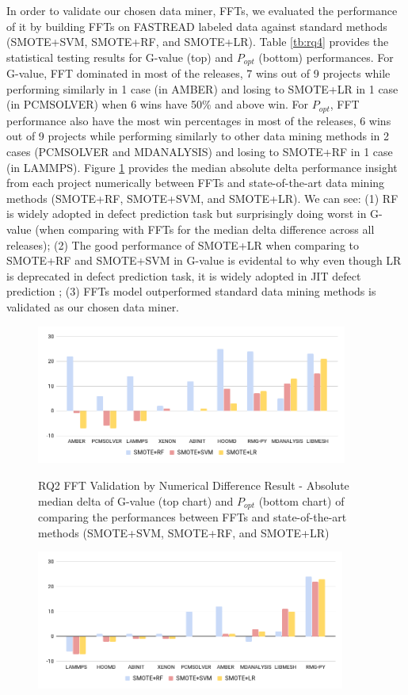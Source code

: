 \documentclass[10pt,conference]{IEEEtran}
\begin{document}
 In order to validate our chosen data miner, FFTs, we evaluated the performance of it by building FFTs on FASTREAD labeled data against standard methods (SMOTE+SVM, SMOTE+RF, and SMOTE+LR). Table \ref{tb:rq4} provides the statistical testing results for G-value (top) and $P_{opt}$ (bottom) performances. For G-value, FFT dominated in most of the releases, 7 wins out of 9 projects while performing similarly in 1 case (in AMBER) and losing to SMOTE+LR in 1 case (in PCMSOLVER) when 6 wins have 50\% and above win. For $P_{opt}$, FFT performance also have the most win percentages in most of the releases, 6 wins out of 9 projects while performing similarly to other data mining methods in 2 cases (PCMSOLVER and MDANALYSIS) and losing to SMOTE+RF in 1 case (in LAMMPS).  Figure \ref{fig:rq4} provides the median absolute delta performance insight from each project numerically between FFTs and state-of-the-art data mining methods (SMOTE+RF, SMOTE+SVM, and SMOTE+LR). We can see: (1) RF is widely adopted in defect prediction task but surprisingly doing worst in G-value (when comparing with FFTs for the median delta difference across all releases); (2) The good performance of SMOTE+LR when comparing to SMOTE+RF and SMOTE+SVM in G-value is evidental to why even though LR is deprecated in defect prediction task, it is widely adopted in JIT defect prediction \cite{commitguru}; (3) FFTs model outperformed standard data mining methods is validated as our chosen data miner. 

 \begin{figure}[!t]
\vspace{-10pt}
\caption{RQ2 FFT Validation by Numerical Difference Result - Absolute median delta of G-value (top chart) and $P_{opt}$ (bottom  chart) of comparing the performances between FFTs and state-of-the-art methods (SMOTE+SVM, SMOTE+RF, and SMOTE+LR)}
\includegraphics[width=\linewidth, height=1.8in]{rq4_1.png}
\label{fig:rq4}
\vspace{-25pt}
\end{figure}
\begin{figure}[!t]
\includegraphics[width=\linewidth, height=1.8in]{rq4_2.png}
\vspace{-25pt}
\end{figure}
 
\end{document}

